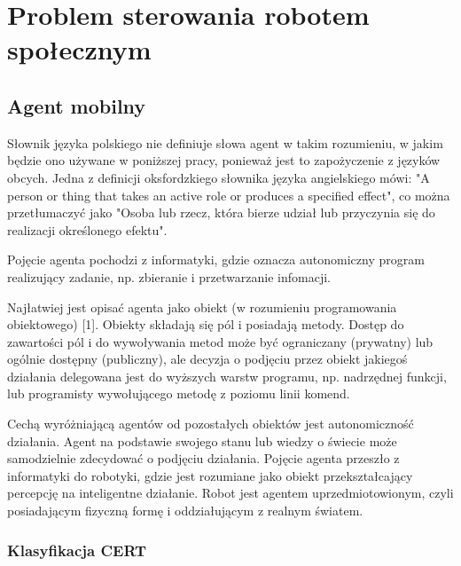 \chapter{Problem sterowania robotem społecznym}

\section{Agent mobilny}
Słownik języka polskiego nie definiuje słowa agent w takim rozumieniu, w jakim będzie ono używane w poniższej pracy, ponieważ jest to zapożyczenie z języków obcych. Jedna z definicji oksfordzkiego słownika języka angielskiego mówi: "A person or thing that takes an active role or produces a specified effect", co można przetłumaczyć jako "Osoba lub rzecz, która bierze udział lub przyczynia się do realizacji określonego efektu". 

Pojęcie agenta pochodzi z informatyki, gdzie oznacza autonomiczny program realizujący zadanie, np. zbieranie i przetwarzanie infomacji.

Najłatwiej jest opisać agenta jako obiekt (w rozumieniu programowania obiektowego) [1]. Obiekty składają się pól i posiadają metody. Dostęp do zawartości pól i do wywoływania metod może być ograniczany (prywatny) lub ogólnie dostępny (publiczny), ale decyzja o podjęciu przez obiekt jakiegoś działania delegowana jest do wyższych warstw programu, np. nadrzędnej funkcji, lub programisty wywołującego metodę z poziomu linii komend. 

Cechą wyróżniającą agentów od pozostałych obiektów jest autonomiczność działania. Agent na podstawie swojego stanu lub wiedzy o świecie może samodzielnie zdecydować o podjęciu działania. Pojęcie agenta przeszło z informatyki do robotyki, gdzie jest rozumiane jako obiekt przekształcający percepcję na inteligentne działanie. Robot jest agentem uprzedmiotowionym, czyli posiadającym fizyczną formę i oddziałującym z realnym światem.

\subsection{Klasyfikacja CERT}


